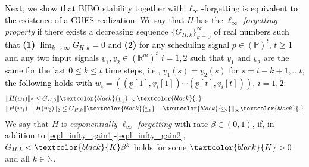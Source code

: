 \documentclass[journal,twoside,web]{ieeecolor}
\begin{document}
      \textcolor{black}{Next, 
      we show that BIBO stability together with $\ell_{\infty}$-forgetting is equivalent to the existence of a GUES realization.}
  We say that $H$ has the \emph{$\ell_{\infty}$-forgetting property} if there exists a decreasing sequence $\{G_{H,k}\}_{k=0}^{\infty}$ 
  \textcolor{black}{of real numbers}
  \textcolor{black}{such that 
  \textbf{(1)} $\lim_{k \rightarrow \infty} G_{H,k}=0$ and
  \textbf{(2)} for any
  scheduling signal $\underline{p} \in (\mathbb{P})^{t}$, $t \ge 1$ and 
  any
  two input signals $\underline{v}_1,\underline{v}_2  \in (\mathbb{R}^{m})^{t}$
  $i=1,2$ %
  such that $\underline{v}_1$ and $\underline{v}_2$} are the same for the last \textcolor{black}{$0 \le k \le t$} time steps, i.e., $\underline{v}_1(s)=\underline{v}_2(s)$ for $s=t-k+1,\ldots t$, \textcolor{black}{ the following holds with 
  $w_i=((\underline{p}[1],\underline{v}_i[1]) \cdots (\underline{p}[t],\underline{v}_i[t]))$, 
  $i=1,2$:}
  \begin{align}
  & \|H(w_1)\|_2 \le G_{H,0} \|\textcolor{black}{\underline{v}_1}\|_{\infty} \label{eq:l_infty_gain1} \textcolor{black}{,} \\
  & \|H(w_1) - H(w_2)\|_2 \le G_{H,k} \|\textcolor{black}{\underline{v}_1}-\textcolor{black}{\underline{v}_2}\|_{\infty}
  \label{eq:l_infty_gain2} \textcolor{black}{.}
  \end{align}
  We say that $H$ is \emph{exponentially  $\ell_{\infty}$-forgetting} \textcolor{black}{with rate $\beta \in (0,1)$}, if, \textcolor{black}{in addition to \eqref{eq:l_infty_gain1}-\eqref{eq:l_infty_gain2},} $G_{H,k}<\textcolor{black}{K}\beta^k$ \textcolor{black}{holds} for some $\textcolor{black}{K} > 0$ and all $k \in \mathbb{N}$. 
\end{document}
